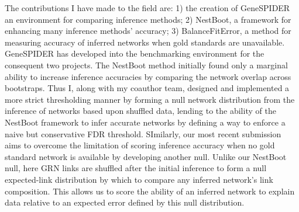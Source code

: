 \begin{abstracts}


The contributions I have made to the field are: 1) the creation of GeneSPIDER an environment for comparing inference methods; 2) NestBoot, a framework for enhancing many inference methods’ accuracy; 3) BalanceFitError, a method for measuring accuracy of inferred networks when gold standards are unavailable. GeneSPIDER has developed into the benchmarking environment for the consequent two projects. The NestBoot method initially found only a marginal ability to increase inference accuracies by comparing the network overlap across bootstraps. Thus I, along with my coauthor team, designed and implemented a more strict thresholding manner by forming a null network distribution from the inference of networks based upon shuffled data, lending to the ability of the NestBoot framework to infer accurate networks by defining a way to enforce a naive but conservative FDR threshold. SImilarly, our most recent submission aims to overcome the limitation of scoring inference accuracy when no gold standard network is available by developing another null. Unlike our NestBoot null, here GRN links are shuffled after the initial inference to form a null expected-link distribution by which to compare any inferred network’s link composition. This allows us to score the ability of an inferred network to explain data relative to an expected error defined by this null distribution. %


\end{abstracts}

